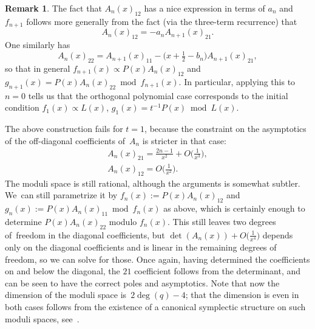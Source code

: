 \documentclass[pdftex]{sigma}
\theoremstyle{definition}
\newtheorem{Remark}[Theorem]{Remark}
\numberwithin{equation}{section}
\begin{document}
\begin{Remark}
 The fact that $A_n(x)_{12}$ has a nice expression in terms of $a_n$ and
 $f_{n+1}$ follows more generally from the fact (via the three-term
 recurrence) that
 \[
 A_n(x)_{12} = -a_n A_{n+1}(x)_{21}.
 \]
 One similarly has
 \[
 A_n(x)_{22} = A_{n+1}(x)_{11} - \big(x+\tfrac{1}{2}-b_n\big) A_{n+1}(x)_{21},
 \]
 so that in general $f_{n+1}(x)\propto P(x)A_n(x)_{12}$ and $g_{n+1}(x) =
 P(x)A_n(x)_{22}\bmod f_{n+1}(x)$.
 In particular, applying this to $n=0$ tells us that the orthogonal polynomial case corresponds to the initial condition $f_1(x)\propto L(x)$, $g_1(x)=t^{-1}P(x)\bmod L(x)$.
\end{Remark}

The above construction fails for $t=1$, because the constraint on the
asymptotics of the off-diagonal coefficients of~$A_n$ is stricter in that
case:
\begin{gather*}
A_n(x)_{21}= \tfrac{2n-1}{x^2} + O\big(\tfrac{1}{x^3}\big),
\\
A_n(x)_{12} = O\big(\tfrac{1}{x^2}\big).
\end{gather*}
The moduli space is still rational, although the arguments is somewhat
subtler. We~can still parametrize it by $f_n(x):=P(x)A_n(x)_{12}$ and
$g_n(x):=P(x)A_n(x)_{11}\bmod f_n(x)$ as above, which is certainly enough
to determine $P(x)A_n(x)_{22}$ modulo $f_n(x)$. This still leaves two
degrees of~freedom in the diagonal coefficients, but
$\det(A_n(x))+O\big(\tfrac{1}{x^4}\big)$ depends only on the diagonal coefficients and is
linear in the remaining degrees of freedom, so we can solve for those.
Once again, having determined the coefficients on and below the diagonal,
the $21$ coefficient follows from the determinant, and can be seen to have
the correct poles and asymptotics. Note that now the dimension of the
moduli space is~$2\deg(q)-4$; that the dimension is even in both cases
follows from the existence of a canonical symplectic structure on such
moduli spaces, see~\cite{Ra}.
\end{document}
